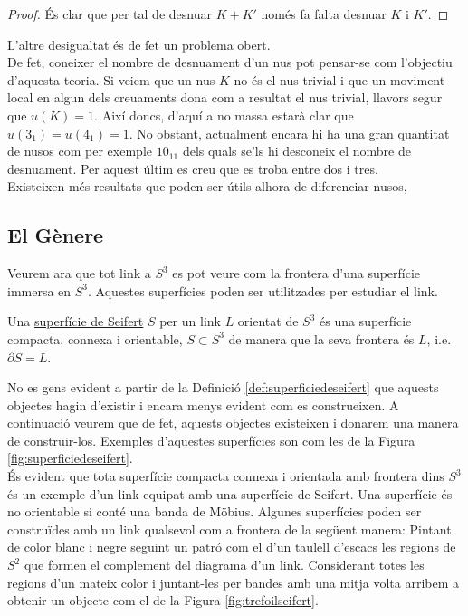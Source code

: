 \begin{proof}
	És clar que per tal de desnuar $K+K'$ només fa falta desnuar $K$ i $K'$.
\end{proof}

L'altre desigualtat és de fet un problema obert.\\

De fet, coneixer el nombre de desnuament d'un nus pot pensar-se com l'objectiu d'aquesta teoria. Si veiem que un nus $K$ no és el nus trivial i que un moviment local en algun dels creuaments dona com a resultat el nus trivial, llavors segur que $u(K)=1$. Així doncs, d'aquí a no massa estarà clar que $u(3_1)=u(4_1)=1$. No obstant, actualment encara hi ha una gran quantitat de nusos com per exemple $10_{11}$ dels quals se'ls hi desconeix el nombre de desnuament. Per aquest últim es creu que es troba entre dos i tres.\\

Existeixen més resultats que poden ser útils alhora de diferenciar nusos, 

\subsection{El Gènere}\label{sec:generescomainvariant}

Veurem ara que tot link a $S^3$ es pot veure com la frontera d'una superfície immersa en $S^3$. Aquestes superfícies poden ser utilitzades per estudiar el link.

\begin{definition}\label{def:superficiedeseifert}
	Una \underline{superfície de Seifert} $S$ per un link $L$ orientat de $S^3$ és una superfície compacta, connexa i orientable, $S\subset S^3$ de manera que la seva frontera és $L$, i.e. $\partial S=L$.
\end{definition}

No es gens evident a partir de la Definició \ref{def:superficiedeseifert} que aquests objectes hagin d'existir i encara menys evident com es construeixen. A continuació veurem que de fet, aquests objectes existeixen i donarem una manera de construir-los. Exemples d'aquestes superfícies son com les de la Figura \ref{fig:superficiedeseifert}. \\

És evident que tota superfície compacta connexa i orientada amb frontera dins $S^3$ és un exemple d'un link equipat amb una superfície de Seifert. Una superfície és no orientable si conté una banda de Möbius. Algunes superfícies poden ser construïdes amb un link qualsevol com a frontera de la següent manera: Pintant de color blanc i negre seguint un patró com el d'un taulell d'escacs les regions de $S^2$ que formen el complement del diagrama d'un link. Considerant totes les regions d'un mateix color i juntant-les per bandes amb una mitja volta arribem a obtenir un objecte com el de la Figura \ref{fig:trefoilseifert}.\\

